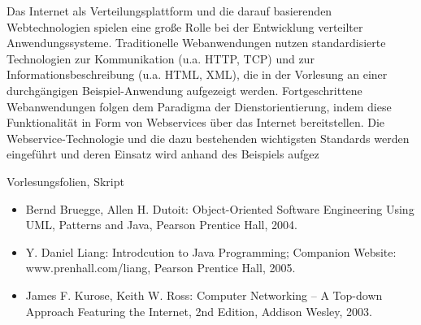 \begin{course}
\begin{content}
Das Internet als Verteilungsplattform und die darauf basierenden Webtechnologien spielen eine große Rolle bei der Entwicklung verteilter Anwendungssysteme. Traditionelle Webanwendungen nutzen standardisierte Technologien zur Kommunikation (u.a. HTTP, TCP) und zur Informationsbeschreibung (u.a. HTML, XML), die in der Vorlesung an einer durchgängigen Beispiel-Anwendung aufgezeigt werden. Fortgeschrittene Webanwendungen folgen dem Paradigma der Dienstorientierung, indem diese Funktionalität in Form von Webservices über das Internet bereitstellen. Die Webservice-Technologie und die dazu bestehenden wichtigsten Standards werden eingeführt und deren Einsatz wird anhand des Beispiels aufgez


\end{content}

\begin{media}Vorlesungsfolien, Skript

\end{media}

\begin{literature}\begin{itemize}\item Bernd Bruegge, Allen H. Dutoit: Object-Oriented Software Engineering Using UML, Patterns and Java, Pearson Prentice Hall, 2004.  \item Y. Daniel Liang: Introdcution to Java Programming; Companion Website: www.prenhall.com/liang, Pearson Prentice Hall, 2005.  \item James F. Kurose, Keith W. Ross: Computer Networking – A Top-down Approach Featuring the Internet, 2nd Edition, Addison Wesley, 2003.  \end{itemize}\end{literature}



\end{course}